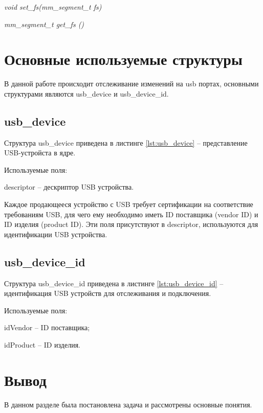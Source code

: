 \textit{void set\_fs(mm\_segment\_t fs)}

\textit{mm\_segment\_t  get\_fs ()}

\section{\textbf{Основные используемые структуры}}

В данной работе происходит отслеживание изменений на usb портах, основными структурами являются usb\_device и usb\_device\_id.

\subsection{\textbf{usb\_device}}

Структура usb\_device приведена в листинге \ref{lst:usb_device} -- представление USB-устройста в ядре.

Используемые поля:

descriptor -- дескриптор USB устройства. 

Каждое продающееся устройство с USB требует сертификации на соответствие требованиям USB, для чего ему необходимо иметь ID поставщика (vendor ID) и ID изделия (product ID). Эти поля присутствуют в descriptor, используются для идентификации USB устройства. 

\subsection{\textbf{usb\_device\_id}}

Структура usb\_device\_id приведена в листинге \ref{lst:usb_device_id} -- идентификация USB устройств для отслеживания и подключения.

Используемые поля:

idVendor -- ID поставщика; 

idProduct -- ID изделия.

\section{\textbf{Вывод}}

В данном разделе была постановлена задача и рассмотрены основные понятия. 